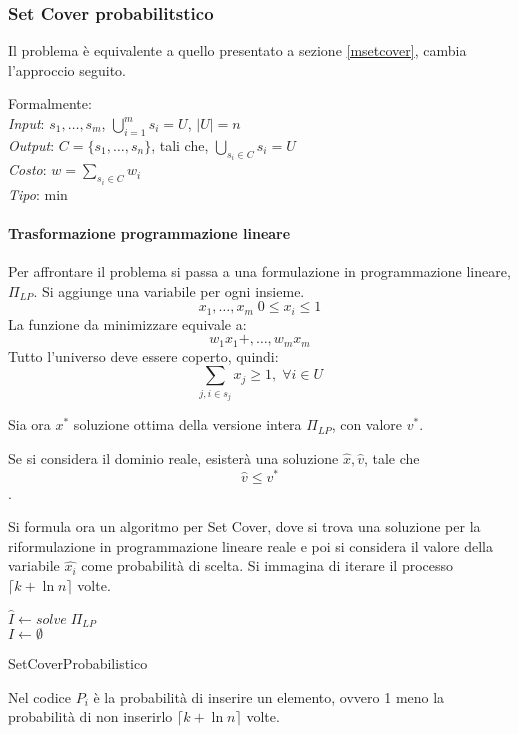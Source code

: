 \subsubsection{Set Cover probabilitstico}
Il problema è equivalente a quello presentato a sezione \ref{msetcover}, cambia
l'approccio seguito.

Formalmente: \\
\emph{Input}: $s_1, \dots, s_m$, $\bigcup_{i=1}^m s_i = U$, $|U| = n$\\
\emph{Output}: $C = \{s_1, \dots, s_n\}$, tali che, $\bigcup_{s_i \in C} s_i = U$\\
\emph{Costo}: $w = \sum_{s_i \in C} w_i$\\
\emph{Tipo}: min

\paragraph{Trasformazione programmazione lineare}
Per affrontare il problema si passa a una formulazione in programmazione lineare, $\Pi_{LP}$.
Si aggiunge una variabile per ogni insieme.
$$x_1, \dots, x_m \;0 \leq x_i\leq 1$$
La funzione da minimizzare equivale a:
$$w_1 x_1 +, \dots, w_m x_m $$
Tutto l'universo deve essere coperto, quindi:
$$\sum_{j, i\in s_j} x_j \geq 1, \; \forall i \in U$$

Sia ora $x^*$ soluzione ottima della versione intera $\Pi_{LP}$, con valore 
$v^*$.

Se si considera il dominio reale, esisterà una soluzione $\hat{x}, \hat{v}$, 
tale che $$\hat{v}\leq v^*$$.

Si formula ora un algoritmo per Set Cover, dove si trova una soluzione 
per la riformulazione in programmazione lineare reale e poi si considera il valore della
variabile $\hat{x_i}$ come probabilità di scelta. 
Si immagina di iterare il processo $\lceil k + \ln n \rceil$ volte.

\begin{algorithm}[H]
    \SetAlgoLined
    $\hat{I} \gets \mathit{solve} \; \Pi_{LP}$ \\
    $I \gets \emptyset$\\
     \caption{SetCoverProbabilistico}
\end{algorithm}
Nel codice $P_i$ è la probabilità di inserire un elemento, ovvero 1 meno la 
probabilità di non inserirlo $\lceil k + \ln n \rceil$ volte.



